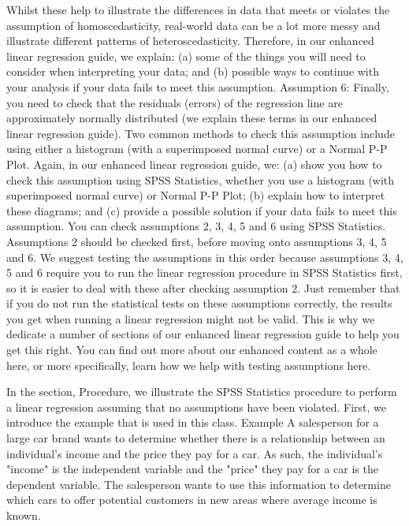 \documentclass[]{article}
\begin{document}
	Whilst these help to illustrate the differences in data that meets or violates the assumption of homoscedasticity, real-world data can be a lot more messy and illustrate different patterns of heteroscedasticity. Therefore, in our enhanced linear regression guide, we explain: (a) some of the things you will need to consider when interpreting your data; and (b) possible ways to continue with your analysis if your data fails to meet this assumption.
	Assumption 6: Finally, you need to check that the residuals (errors) of the regression line are approximately normally distributed (we explain these terms in our enhanced linear regression guide). Two common methods to check this assumption include using either a histogram (with a superimposed normal curve) or a Normal P-P Plot. Again, in our enhanced linear regression guide, we: (a) show you how to check this assumption using SPSS Statistics, whether you use a histogram (with superimposed normal curve) or Normal P-P Plot; (b) explain how to interpret these diagrams; and (c) provide a possible solution if your data fails to meet this assumption.
	You can check assumptions 2, 3, 4, 5 and 6 using SPSS Statistics. Assumptions 2 should be checked first, before moving onto assumptions 3, 4, 5 and 6. We suggest testing the assumptions in this order because assumptions 3, 4, 5 and 6 require you to run the linear regression procedure in SPSS Statistics first, so it is easier to deal with these after checking assumption 2. Just remember that if you do not run the statistical tests on these assumptions correctly, the results you get when running a linear regression might not be valid. This is why we dedicate a number of sections of our enhanced linear regression guide to help you get this right. You can find out more about our enhanced content as a whole here, or more specifically, learn how we help with testing assumptions here.
	
	In the section, Procedure, we illustrate the SPSS Statistics procedure to perform a linear regression assuming that no assumptions have been violated. First, we introduce the example that is used in this class.
	Example
	A salesperson for a large car brand wants to determine whether there is a relationship between an individual's income and the price they pay for a car. As such, the individual's "income" is the independent variable and the "price" they pay for a car is the dependent variable. The salesperson wants to use this information to determine which cars to offer potential customers in new areas where average income is known.
	
\end{document}
